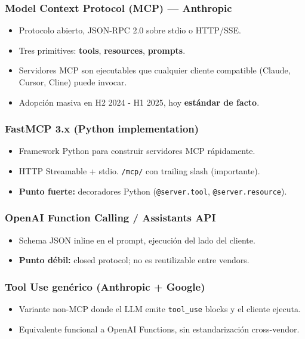 \documentclass[11pt,a4paper]{article}
\begin{document}
\subsubsection{Model Context Protocol (MCP) — Anthropic}
\begin{itemize}[leftmargin=*,itemsep=0pt]
\item Protocolo abierto, JSON-RPC 2.0 sobre stdio o HTTP/SSE.
\item Tres primitives: \textbf{tools}, \textbf{resources}, \textbf{prompts}.
\item Servidores MCP son ejecutables que cualquier cliente compatible (Claude, Cursor, Cline) puede invocar.
\item Adopción masiva en H2 2024 - H1 2025, hoy \textbf{estándar de facto}.
\end{itemize}

\subsubsection{FastMCP 3.x (Python implementation)}
\begin{itemize}[leftmargin=*,itemsep=0pt]
\item Framework Python para construir servidores MCP rápidamente.
\item HTTP Streamable + stdio. \texttt{/mcp/} con trailing slash (importante).
\item \textbf{Punto fuerte:} decoradores Python (\texttt{@server.tool}, \texttt{@server.resource}).
\end{itemize}

\subsubsection{OpenAI Function Calling / Assistants API}
\begin{itemize}[leftmargin=*,itemsep=0pt]
\item Schema JSON inline en el prompt, ejecución del lado del cliente.
\item \textbf{Punto débil:} closed protocol; no es reutilizable entre vendors.
\end{itemize}

\subsubsection{Tool Use genérico (Anthropic + Google)}
\begin{itemize}[leftmargin=*,itemsep=0pt]
\item Variante non-MCP donde el LLM emite \texttt{tool\_use} blocks y el cliente ejecuta.
\item Equivalente funcional a OpenAI Functions, sin estandarización cross-vendor.
\end{itemize}
\end{document}
